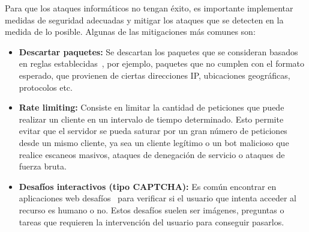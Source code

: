 Para que los ataques informáticos no tengan éxito, es importante implementar medidas de seguridad adecuadas y mitigar los ataques que se detecten en la medida de lo posible. 
Algunas de las mitigaciones más comunes son:
\begin{itemize}
	\item \textbf{Descartar paquetes:} Se descartan los paquetes que se consideran basados en reglas establecidas~\cite{Liu2018,Yungaicela-Naula2022}, por ejemplo, paquetes que no cumplen con el formato esperado, que provienen de ciertas direcciones IP, ubicaciones geográficas, protocolos etc. 

    \item \textbf{Rate limiting:} Consiste en limitar la cantidad de peticiones que puede realizar un cliente en un intervalo de tiempo determinado. Esto permite evitar que el servidor se pueda saturar por un gran número de peticiones desde un mismo cliente, ya sea un cliente legítimo o un bot malicioso que realice escaneos masivos, ataques de denegación de servicio o ataques de fuerza bruta.

    \item \textbf{Desafíos interactivos (tipo CAPTCHA):} Es común encontrar en aplicaciones web desafíos~\cite{CloudflareDocsTeam2025} para verificar si el usuario que intenta acceder al recurso es humano o no. Estos desafíos suelen ser imágenes, preguntas o tareas que requieren la intervención del usuario para conseguir pasarlos.
\end{itemize}